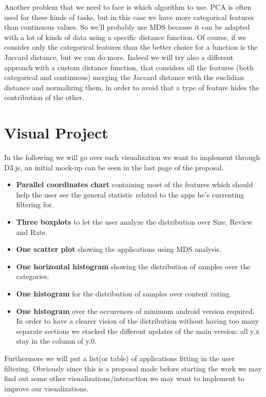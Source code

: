 \documentclass[a4paper, 11pt]{article}
\begin{document}
Another problem that we need to face is which algorithm to use. PCA is often used for these kinds of tasks, but in this case we have more categorical features than continuous values. So we'll probably use MDS because it can be adapted with a lot of kinds of data using a specific distance function. Of course, if we consider only the categorical features than the better choice for a function is the Jaccard distance, but we can do more. Indeed we will try also a different approach with a custom distance function, that considers all the features (both categorical and continuous) merging the Jaccard distance with the euclidian distance and normalizing them, in order to avoid that a type of feature hides the contribution of the other.

\section{Visual Project}
In the following we will go over each visualization we want to implement through D3.js, an initial mock-up can be seen in the last page of the proposal.
\begin{itemize}
\item \textbf{Parallel coordinates chart} containing most of the features which should help the user see the general statistic related to the apps he's currenting filtering for.
\item \textbf{Three boxplots} to let the user analyze the distribution over Size, Review and Rate.
\item \textbf{One scatter plot} showing the applications using MDS analysis.
\item \textbf{One horizontal histogram} showing the distribution of samples over the categories.
\item \textbf{One histogram} for the distribution of samples over content rating.
\item \textbf{One histogram} over the occurences of minimum android version required. In order to have a clearer vision of the distribution without having too many separate sections we stacked the different updates of the main version: all y.x stay in the column of y.0.
\end{itemize}
Furthermore we will put a list(or table) of applications fitting in the user filtering. Obviously since this is a proposal made before starting the work we may find out some other visualizations/interaction we may want to implement to improve our visualizations.
\end{document}
